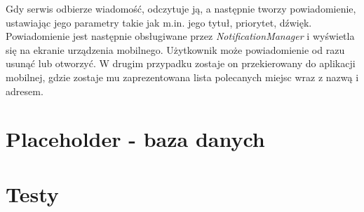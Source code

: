 \documentclass[10pt,twoside,a4paper]{report}
\begin{document}
\par Gdy serwis odbierze wiadomość, odczytuje ją, a następnie tworzy powiadomienie, ustawiając jego parametry takie jak m.in. jego tytuł, priorytet, dźwięk. Powiadomienie jest następnie obsługiwane przez \textit{NotificationManager} i wyświetla się na ekranie urządzenia mobilnego. Użytkownik może powiadomienie od razu usunąć lub otworzyć. W drugim przypadku zostaje on przekierowany do aplikacji mobilnej, gdzie zostaje mu zaprezentowana lista polecanych miejsc wraz z nazwą i adresem.


\chapter{Placeholder - baza danych}

\chapter{Testy}
\end{document}
